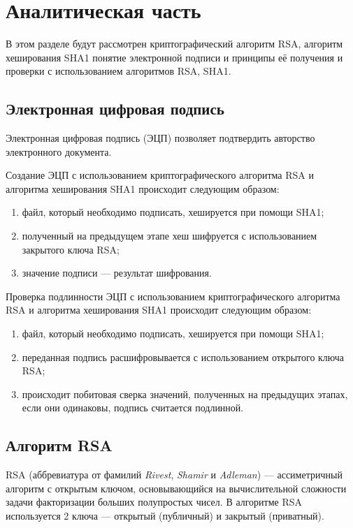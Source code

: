 \chapter{Аналитическая часть}

В этом разделе будут рассмотрен криптографический алгоритм RSA, алгоритм хеширования SHA1 понятие электронной подписи и принципы её получения и проверки с использованием алгоритмов RSA, SHA1.

\section{Электронная цифровая подпись}

Электронная цифровая подпись (ЭЦП) позволяет подтвердить авторство электронного документа.

Создание ЭЦП с использованием криптографического алгоритма RSA и алгоритма хеширования SHA1 происходит следующим образом:
\begin{enumerate}[label=\arabic*)]
	\item файл, который необходимо подписать, хешируется  при помощи SHA1;
	\item полученный на предыдущем этапе хеш шифруется с использованием закрытого ключа RSA;
	\item значение подписи --- результат шифрования.
\end{enumerate}

Проверка подлинности ЭЦП с использованием криптографического алгоритма RSA и алгоритма хеширования SHA1 происходит следующим образом:

\begin{enumerate}[label=\arabic*)]
	\item файл, который необходимо подписать, хешируется  при помощи SHA1;
	\item переданная подпись расшифровывается с использованием открытого ключа RSA;
	\item происходит побитовая сверка значений, полученных на предыдущих этапах, если они одинаковы, подпись считается подлинной.
\end{enumerate}

\section{Алгоритм RSA}

RSA (аббревиатура от фамилий \textit{Rivest}, \textit{Shamir} и \textit{Adleman}) --- ассиметричный алгоритм с открытым ключом, основывающийся на вычислительной сложности задачи факторизации больших полупростых чисел. В алгоритме RSA используется 2 ключа --- открытый (публичный) и закрытый (приватный).

